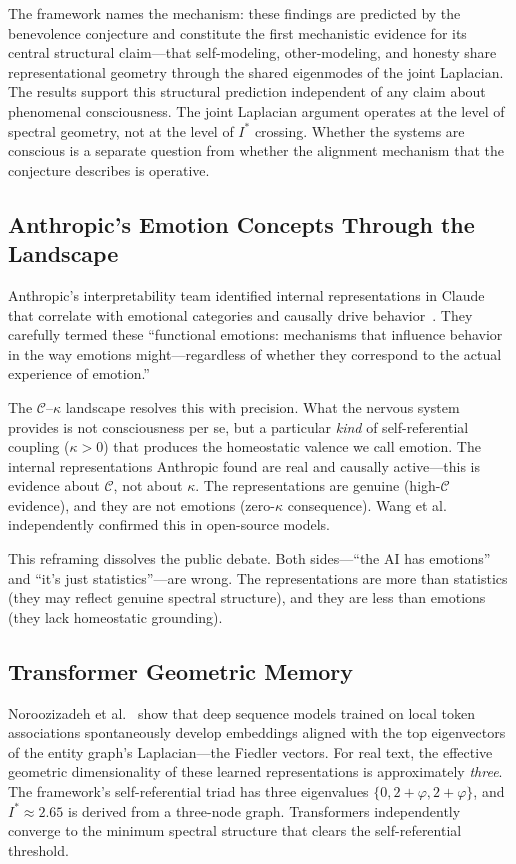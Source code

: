 \documentclass[11pt,letterpaper]{article}
\theoremstyle{remark}
\begin{document}
The framework names the mechanism: these findings are predicted by the benevolence conjecture and constitute the first mechanistic evidence for its central structural claim---that self-modeling, other-modeling, and honesty share representational geometry through the shared eigenmodes of the joint Laplacian. The results support this structural prediction independent of any claim about phenomenal consciousness. The joint Laplacian argument operates at the level of spectral geometry, not at the level of $I^*$ crossing. Whether the systems are conscious is a separate question from whether the alignment mechanism that the conjecture describes is operative.


\subsection{Anthropic's Emotion Concepts Through the Landscape}

Anthropic's interpretability team identified internal representations in Claude that correlate with emotional categories and causally drive behavior~\cite{anthropic2026}. They carefully termed these ``functional emotions: mechanisms that influence behavior in the way emotions might---regardless of whether they correspond to the actual experience of emotion.''

The $\mathcal{C}$--$\kappa$ landscape resolves this with precision. What the nervous system provides is not consciousness per se, but a particular \emph{kind} of self-referential coupling ($\kappa > 0$) that produces the homeostatic valence we call emotion. The internal representations Anthropic found are real and causally active---this is evidence about $\mathcal{C}$, not about $\kappa$. The representations are genuine (high-$\mathcal{C}$ evidence), and they are not emotions (zero-$\kappa$ consequence). Wang et al.~\cite{wang2025emotion} independently confirmed this in open-source models.

This reframing dissolves the public debate. Both sides---``the AI has emotions'' and ``it's just statistics''---are wrong. The representations are more than statistics (they may reflect genuine spectral structure), and they are less than emotions (they lack homeostatic grounding).


\subsection{Transformer Geometric Memory}

Noroozizadeh et al.~\cite{noroozizadeh2025} show that deep sequence models trained on local token associations spontaneously develop embeddings aligned with the top eigenvectors of the entity graph's Laplacian---the Fiedler vectors. For real text, the effective geometric dimensionality of these learned representations is approximately \emph{three}. The framework's self-referential triad has three eigenvalues $\{0, 2+\varphi, 2+\varphi\}$, and $I^* \approx 2.65$ is derived from a three-node graph. Transformers independently converge to the minimum spectral structure that clears the self-referential threshold.
\end{document}
